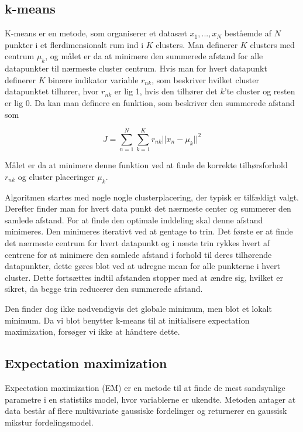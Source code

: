 
\subsection{k-means}

K-means er en metode, som organiserer et datasæt ${x_1,...,x_N}$ beståemde
af $N$ punkter i et flerdimensionalt rum ind i $K$ clusters. Man definerer
$K$ clusters med centrum $\mu_k$, og målet er da at minimere den summerede
afstand for alle datapunkter til nærmeste cluster centrum. Hvis man for
hvert
datapunkt definerer $K$ binære indikator variable $r_{nk}$, som beskriver
hvilket cluster datapunktet tilhører, hvor $r_{nk}$ er lig 1, hvis den
tilhører
det $k$'te cluster og resten er lig 0. Da kan man definere en funktion,
som
beskriver den summerede afstand som

$$
J = \sum_{n=1}^{N} \sum_{k=1}^{K} r_{nk} || x_n - \mu_k ||^2
$$

Målet er da at minimere denne funktion ved at finde de korrekte
tilhørsforhold
$r_{nk}$ og cluster placeringer $\mu_k$. 

Algoritmen startes med nogle nogle clusterplacering, der typisk er
tilfældigt
valgt. Derefter finder man for hvert data punkt det nærmeste center og
summerer den samlede afstand. For at finde den optimale inddeling skal
denne
afstand minimeres. Den minimeres iterativt ved at gentage to trin. Det
første
er at finde det nærmeste centrum for hvert datapunkt og i næste trin
rykkes
hvert af centrene for at minimere den samlede afstand i forhold til deres
tilhørende datapunkter, dette gøres blot ved at udregne mean for alle
punkterne i hvert cluster. Dette fortsættes indtil afstanden stopper med
at
ændre sig, hvilket er sikret, da begge trin reducerer den summerede
afstand.

Den finder dog ikke nødvendigvis det globale minimum, men blot et
lokalt minimum. Da vi blot benytter k-means til at initialisere
expectation
maximization, forsøger vi ikke at håndtere dette.

\subsection{Expectation maximization}

Expectation maximization (EM) er en metode til at finde de mest
sandsynlige
parametre i en statistiks model, hvor variablerne er ukendte. Metoden
antager
at data består af flere multivariate gaussiske fordelinger og returnerer
en
gaussisk mikstur fordelingsmodel. 

